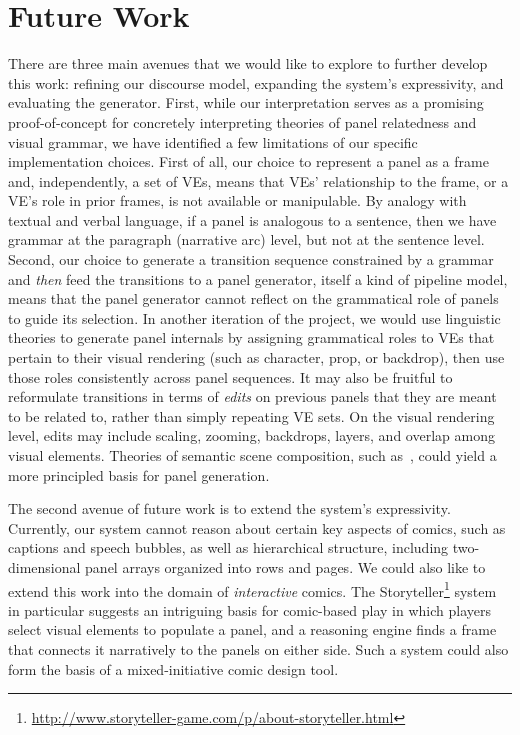 \section{Future Work}

There are three main avenues that we would like to explore to further develop
this work: refining our discourse model, expanding the system's
expressivity, and evaluating the generator.
%
First, while our interpretation serves as a promising proof-of-concept for
concretely interpreting theories of panel relatedness and visual grammar,
we have identified a few limitations of our specific implementation
choices.  First of all, our choice to represent a panel as a frame and,
independently, a set of VEs, means that VEs' relationship to the frame, or
a VE's role in prior frames, is not available or manipulable.  By analogy
with textual and verbal language, if a panel is analogous to a sentence,
then we have grammar at the paragraph (narrative arc) level, but not at
the sentence level.  Second, our choice to generate a transition sequence
constrained by a grammar and {\em then} feed the transitions to a panel
generator, itself a kind of pipeline model, means that the panel generator
cannot reflect on the grammatical role of panels to guide its selection.
%
In another iteration of the project, we would use linguistic theories to
generate panel internals by assigning grammatical roles to VEs that pertain
to their visual rendering (such as character, prop, or backdrop), then use
those roles consistently across panel sequences. It may also be fruitful to
reformulate transitions in terms of {\em edits} on previous panels that
they are meant to be related to, rather than simply repeating VE sets.
On the visual rendering level, edits may include scaling, zooming,
backdrops, layers, and overlap among visual elements.  Theories of semantic
scene composition, such as~\cite{zitnick2013bringing}, could yield a more
principled basis for panel generation.

The second avenue of future work is to extend the system's expressivity.
Currently, our system cannot reason about certain key aspects of
comics, such as captions and speech bubbles, as well as hierarchical structure,
including two-dimensional panel arrays organized into rows and pages.  We
could also like to extend this work into the domain of {\em interactive}
comics. The
Storyteller\footnote{\url{http://www.storyteller-game.com/p/about-storyteller.html}}
system in particular suggests an intriguing basis for comic-based play in
which players select visual elements to populate a panel, and a reasoning
engine finds a frame that connects it narratively to the panels on either
side.  Such a system could also form the basis of a mixed-initiative comic
design tool.

